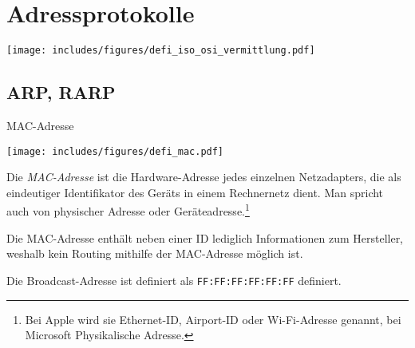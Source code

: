 \section{Adressprotokolle}

\texttt{[image: includes/figures/defi\_iso\_osi\_vermittlung.pdf]}

\subsection{ARP, RARP}

\begin{defi}{MAC-Adresse}
    \begin{center}
        \texttt{[image: includes/figures/defi\_mac.pdf]}
    \end{center}

    Die \emph{MAC-Adresse} ist die Hardware-Adresse jedes einzelnen Netzadapters, die als eindeutiger Identifikator des Geräts in einem Rechnernetz dient.
    Man spricht auch von physischer Adresse oder Geräteadresse.\footnote{Bei Apple wird sie Ethernet-ID, Airport-ID oder Wi-Fi-Adresse genannt, bei Microsoft Physikalische Adresse.}

    Die MAC-Adresse enthält neben einer ID lediglich Informationen zum Hersteller, weshalb kein Routing mithilfe der MAC-Adresse möglich ist.

    Die Broadcast-Adresse ist definiert als \texttt{FF:FF:FF:FF:FF:FF} definiert.

\end{defi}

